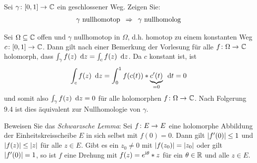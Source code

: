 \begin{exercisePage}
	
	\begin{task}
		Sei $\abb{\gamma}{[0,1]}{\CC}$ ein geschlossener Weg. Zeigen Sie:
		\begin{equation*}
			\gamma \text{ nullhomotop} \enskip \Rightarrow \enskip \gamma \text{ nullhomolog}
		\end{equation*}		
	\end{task}

	Sei $\Omega \subseteq \mathbb{C}$ offen und $\gamma$ nullhomotop in $\Omega$, d.h. homotop zu einem konstanten Weg $\abb{c}{[0,1]}{\CC}$. Dann gilt nach einer Bemerkung der Vorlesung für alle $\abb{f}{\Omega}{\CC}$ holomorph, dass $\int_\gamma f(z) \enskip \mathrm{d}z = \int_c f(z) \enskip \mathrm{d}z$. Da $c$ konstant ist, ist 
	\begin{equation*}
		\int_c f(z) \enskip \mathrm{d}z = \int_0^1 f(c(t)) * \underbrace{c'(t)}_{=0} \enskip \mathrm{d}t = 0
	\end{equation*}
	und somit also $\int_\gamma f(z) \enskip \mathrm{d}z = 0$ für alle holomorphen $\abb{f}{\Omega}{\CC}$. Nach Folgerung 9.4 ist dies äquivalent zur Nullhomologie von $\gamma$.
	
	
	\begin{task}
		Beweisen Sie das \textit{Schwarzsche Lemma}: Sei $\abb{f}{E}{E}$ eine holomorphe Abbildung der Einheitskreisscheibe $E$ in sich selbst mit $f(0) = 0$. Dann gilt $\left| f'(0) \right| \le 1$ und $\left| f(z) \right| \le \left| z \right|$ für alle $z \in E$. Gibt es ein $z_0 \neq 0$ mit $\left| f(z_0) \right| = \left| z_0 \right|$ oder gilt $\left| f'(0) \right| = 1$, so ist $f$ eine Drehung mit $f(z) = e^{\mathrm{i} \theta} * z$ für ein $\theta \in \mathbb{R}$ und alle $z \in E$.
	\end{task}


\end{exercisePage}
